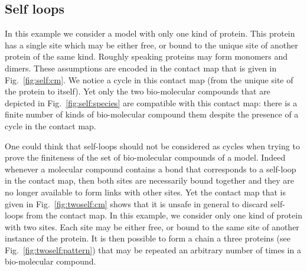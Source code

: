 \documentclass{entcs}
\begin{document}
\subsection{Self loops}
\label{sec:self-loop}
In this example we consider a model with only one kind of protein. This protein has a single site which may be either free, or bound to the unique site of another protein of the same kind. Roughly speaking proteins may form monomers  and dimers. These assumptions are encoded in the contact map that is given in Fig.~\ref{fig:self:cm}. We notice a cycle in this contact map (from the unique site of the protein to itself). Yet only the two bio-molecular compounds that are depicted in Fig.~\ref{fig:self:species} are compatible with this contact map:  there is a finite number of kinds of bio-molecular compound them despite the presence of a cycle in the contact map.

One could think that self-loops should not be considered as cycles when trying to prove the finiteness of the set of bio-molecular compounds of a model. Indeed whenever a molecular compound contains a bond that corresponds to a self-loop in the contact map, then both sites are necessarily  bound together and they are no longer available to form links with other sites. Yet the contact map that is given in Fig.~\ref{fig:twoself:cm} shows that it is unsafe in general  to discard self-loops from the contact map. In this example, we consider only one kind of protein with two sites. Each site may be either free, or bound to the same site of another instance of the protein. It is then possible to form a chain a three proteins (see Fig.~\ref{fig:twoself:pattern}) that may be repeated an arbitrary number of times in a bio-molecular compound.
\end{document}
